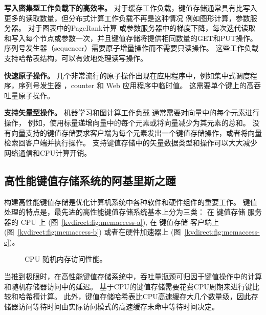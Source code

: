 \textbf {写入密集型工作负载下的高效率。}
对于缓存工作负载，键值存储通常具有比写入更多的读取数量\cite {atikoglu2012workload}，但分布式计算工作负载不再是这种情况
例如图形计算\cite {page1999pagerank}，参数服务器\cite {li2014scaling}。
对于图表中的PageRank计算\cite {page1999pagerank} 或参数服务器中的梯度下降\cite {li2014scaling}，每次迭代读取和写入每个节点或参数一次，并且键值存储将提供相同数量的GET和PUT操作。
序列号发生器（sequencer）\cite {kalia2016design}需要原子增量操作而不需要只读操作。
这些工作负载支持哈希表结构，可以有效地处理读写操作。

\textbf {快速原子操作。}
几个非常流行的原子操作出现在应用程序中，例如集中式调度程序\cite {perry2014fastpass}，序列号发生器 \cite {kalia2016design,eris}，counter \cite {zhu2015packet}和 Web 应用程序中临时值\cite {atikoglu2012workload}。
这需要单个键上的高吞吐量原子操作。

\textbf {支持矢量型操作。}
机器学习和图计算工作负载\cite {li2014scaling,shao2013trinity,xiao17tux2} 通常需要对向量中的每个元素进行操作，
例如，使用标量递增向量中的每个元素或将向量减少为其元素的总和。
没有向量支持的键值存储要求客户端为每个元素发出一个键值存储操作，或者将向量检索回客户端并执行操作。
支持键值存储中的矢量数据类型和操作可以大大减少网络通信和CPU计算开销。

\subsection{高性能键值存储系统的阿基里斯之踵}
\label{kvdirect:sec:state-of-the-art-kvs}

构建高性能键值存储是优化计算机系统中各种软件和硬件组件的重要工作。
键值处理的特点是，最先进的高性能键值存储系统基本上分为三类：
在 键值存储 服务器的 CPU 上
(图~\ref{kvdirect:fig:memaccess-a}),
在 键值存储 客户端上
(图~\ref{kvdirect:fig:memaccess-b})
或者在硬件加速器上
(图~\ref{kvdirect:fig:memaccess-c})。


\begin{figure}[t]
	\centering
	\caption{CPU 随机内存访问性能。}
	\label{kvdirect:fig:cpu-mem}
\end{figure}

当推到极限时，在高性能键值存储系统中，吞吐量瓶颈可归因于键值操作中的计算和随机存储器访问中的延迟。
基于CPU的键值存储需要花费CPU周期来进行键比较和哈希槽计算。
此外，键值存储哈希表比CPU高速缓存大几个数量级，因此存储器访问等待时间由实际访问模式的高速缓存未命中等待时间决定。


